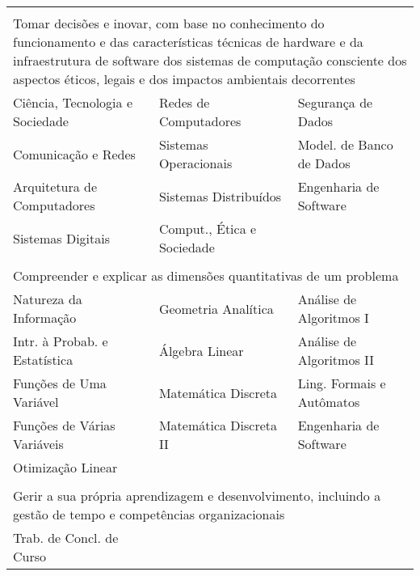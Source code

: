 \begin{longtable}{|p{}p{}p{}|}
    \multicolumn{3}{p{0.95\textwidth}}{}\\

    \multicolumn{3}{p{0.95\textwidth}}{Tomar decisões e inovar, com base no
    conhecimento do funcionamento e das características técnicas de hardware
    e da infraestrutura de software dos sistemas de computação consciente dos
    aspectos éticos, legais e dos impactos ambientais decorrentes}\\
    \hline
    \textcolor{nred}{Ciência, Tecnologia e Sociedade} &
    \textcolor{nblue}{Redes de Computadores} &
    \textcolor{nblue}{Segurança de Dados}\\
    \textcolor{nred}{Comunicação e Redes} &
    \textcolor{nblue}{Sistemas Operacionais} &
    \textcolor{nblue}{\small Model. de Banco de Dados}\\
    \textcolor{nblue}{Arquitetura de Computadores} &
    \textcolor{nblue}{Sistemas Distribuídos} &
    \textcolor{nblue}{Engenharia de Software} \\
    \textcolor{nblue}{Sistemas Digitais} &
    \textcolor{nblue}{Comput., Ética e Sociedade} & \\
    \hline
    
    \multicolumn{3}{p{0.95\textwidth}}{}\\
    \multicolumn{3}{p{0.95\textwidth}}{Compreender e explicar as dimensões quantitativas de um
    problema}\\
    \hline
    \textcolor{nred}{Natureza da Informação} &
    \textcolor{nred}{Geometria Analítica} &
    \textcolor{nblue}{Análise de Algoritmos I} \\
    \textcolor{nred}{Intr. à Probab. e Estatística} &
    \textcolor{nblue}{Álgebra Linear} &
    \textcolor{nblue}{Análise de Algoritmos II} \\
    \textcolor{nred}{Funções de Uma Variável} &
    \textcolor{nblue}{Matemática Discreta} &
    \textcolor{nblue}{Ling. Formais e Autômatos} \\
    \textcolor{nred}{Funções de Várias Variáveis} &
    \textcolor{nblue}{Matemática Discreta II} &
    \textcolor{nblue}{Engenharia de Software}\\
    \textcolor{nyellow}{Otimização Linear} & & \\
    \hline
    
    \multicolumn{3}{p{0.95\textwidth}}{}\\
    \multicolumn{3}{p{0.95\textwidth}}{Gerir a sua própria aprendizagem e
    desenvolvimento, incluindo a gestão de tempo e competências
    organizacionais}\\
    \hline
    \textcolor{nblue}{Trab. de Concl. de Curso} & & \\
    \hline
    

\end{longtable}
